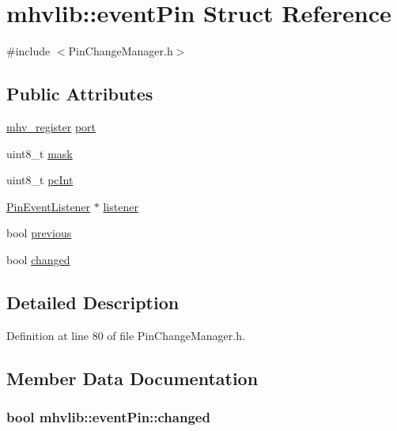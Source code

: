 \hypertarget{structmhvlib_1_1event_pin}{\section{mhvlib\-:\-:event\-Pin Struct Reference}
\label{structmhvlib_1_1event_pin}
}


{\ttfamily \#include $<$Pin\-Change\-Manager.\-h$>$}

\subsection*{Public Attributes}
\begin{DoxyCompactItemize}
\item 
\hyperlink{namespacemhvlib_a0c171f0b162817f27df6c10c611a0f37}{mhv\-\_\-register} \hyperlink{structmhvlib_1_1event_pin_ad0281c89bd5d5aea84e128be1b67c1f9}{port}
\item 
uint8\-\_\-t \hyperlink{structmhvlib_1_1event_pin_a19bb0749006218fc3f73c5c3d7d440fa}{mask}
\item 
uint8\-\_\-t \hyperlink{structmhvlib_1_1event_pin_aaf8901e6810fc3e41ee99bb70c7b689f}{pc\-Int}
\item 
\hyperlink{classmhvlib_1_1_pin_event_listener}{Pin\-Event\-Listener} $\ast$ \hyperlink{structmhvlib_1_1event_pin_ae901f8f0914478b67fdd85b31c87c5a4}{listener}
\item 
bool \hyperlink{structmhvlib_1_1event_pin_af5233c774e93080e309e09734d4a93f4}{previous}
\item 
bool \hyperlink{structmhvlib_1_1event_pin_a9f783f9f5af62137d4ce1f7a9bb4286c}{changed}
\end{DoxyCompactItemize}


\subsection{Detailed Description}


Definition at line 80 of file Pin\-Change\-Manager.\-h.



\subsection{Member Data Documentation}
\hypertarget{structmhvlib_1_1event_pin_a9f783f9f5af62137d4ce1f7a9bb4286c}{
\subsubsection[{changed}]{\setlength{\rightskip}{0pt plus 5cm}bool mhvlib\-::event\-Pin\-::changed}}\label{structmhvlib_1_1event_pin_a9f783f9f5af62137d4ce1f7a9bb4286c}


